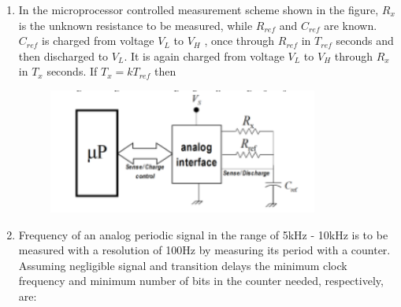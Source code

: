 \documentclass[journal,12pt,onecolumn]{IEEEtran}
\theoremstyle{remark}
\begin{document}
\begin{enumerate}
    \item In the microprocessor controlled measurement scheme shown in the figure, $R_x$ is the unknown resistance to be measured, while $R_{ref}$ and $C_{ref}$ are known. $C_{ref}$ is charged from voltage $V_L$ to $V_H$ , once through $R_{ref}$ in $T_{ref}$ seconds and then discharged to $V_L$. It is again charged from voltage $V_L$ to $V_H$ through $R_x$ in $T_x$ seconds. If $T_x = k T_{ref}$ then
    \begin{figure}[H]
        \centering
        \includegraphics[width=0.6\columnwidth]{q47}
        \caption*{}
        \label{fig:q47}
    \end{figure}

    \hfill{}
        \begin{enumerate}
        \end{enumerate}

    \item Frequency of an analog periodic signal in the range of 5kHz - 10kHz is to be measured with a resolution of 100Hz by measuring its period with a counter. Assuming negligible signal and transition delays the minimum clock frequency and minimum number of bits in the counter needed, respectively, are:

    \hfill{}
        \begin{enumerate}
        \end{enumerate}


\end{enumerate}
\end{document}
